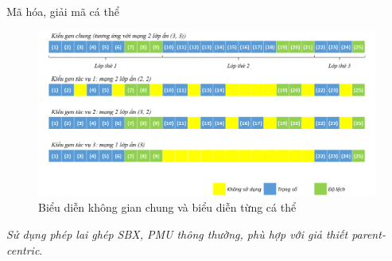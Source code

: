 	\begin{frame}{Mã hóa, giải mã cá thể}
	    \begin{figure}[]
            \centering
            \includegraphics[width=1.0\linewidth]{images/neural-decode.jpg}
            \caption{Biểu diễn không gian chung và biểu diễn từng cá thể}
            \label{fig:problem:neural-ex1}
        \end{figure}
        \textit{Sử dụng phép lai ghép SBX, PMU thông thường, phù hợp với giả thiết parent-centric}.
	\end{frame}